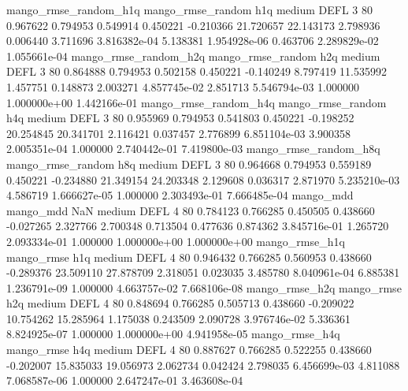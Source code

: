 mango_rmse_random_h1q mango_rmse_random                  h1q     medium     DEFL                 3 80  0.967622       0.794953 0.549914       0.450221   -0.210366     21.720657     22.143173     2.798936       0.006440  3.711696 3.816382e-04     5.138381   1.954928e-06            0.463706    2.289829e-02        1.055661e-04
mango_rmse_random_h2q mango_rmse_random                  h2q     medium     DEFL                 3 80  0.864888       0.794953 0.502158       0.450221   -0.140249      8.797419     11.535992     1.457751       0.148873  2.003271 4.857745e-02     2.851713   5.546794e-03            1.000000    1.000000e+00        1.442166e-01
mango_rmse_random_h4q mango_rmse_random                  h4q     medium     DEFL                 3 80  0.955969       0.794953 0.541803       0.450221   -0.198252     20.254845     20.341701     2.116421       0.037457  2.776899 6.851104e-03     3.900358   2.005351e-04            1.000000    2.740442e-01        7.419800e-03
mango_rmse_random_h8q mango_rmse_random                  h8q     medium     DEFL                 3 80  0.964668       0.794953 0.559189       0.450221   -0.234880     21.349154     24.203348     2.129608       0.036317  2.871970 5.235210e-03     4.586719   1.666627e-05            1.000000    2.303493e-01        7.666485e-04
            mango_mdd         mango_mdd                  NaN     medium     DEFL                 4 80  0.784123       0.766285 0.450505       0.438660   -0.027265      2.327766      2.700348     0.713504       0.477636  0.874362 3.845716e-01     1.265720   2.093334e-01            1.000000    1.000000e+00        1.000000e+00
       mango_rmse_h1q        mango_rmse                  h1q     medium     DEFL                 4 80  0.946432       0.766285 0.560953       0.438660   -0.289376     23.509110     27.878709     2.318051       0.023035  3.485780 8.040961e-04     6.885381   1.236791e-09            1.000000    4.663757e-02        7.668106e-08
       mango_rmse_h2q        mango_rmse                  h2q     medium     DEFL                 4 80  0.848694       0.766285 0.505713       0.438660   -0.209022     10.754262     15.285964     1.175038       0.243509  2.090728 3.976746e-02     5.336361   8.824925e-07            1.000000    1.000000e+00        4.941958e-05
       mango_rmse_h4q        mango_rmse                  h4q     medium     DEFL                 4 80  0.887627       0.766285 0.522255       0.438660   -0.202007     15.835033     19.056973     2.062734       0.042424  2.798035 6.456699e-03     4.811088   7.068587e-06            1.000000    2.647247e-01        3.463608e-04
